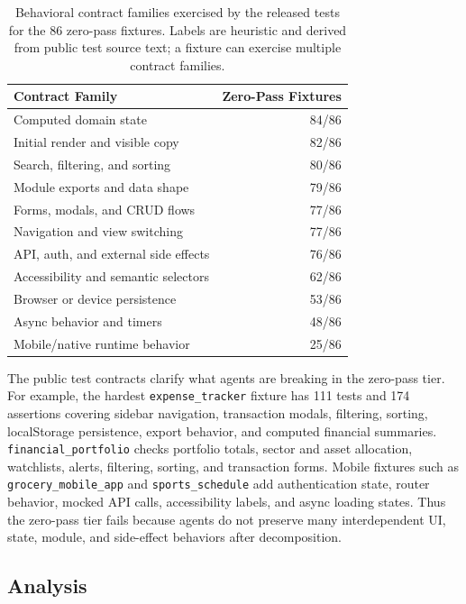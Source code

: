\documentclass[11pt,letterpaper]{article}
\begin{document}
\begin{table}[ht]
\centering
\caption{Behavioral contract families exercised by the released tests for the 86 zero-pass fixtures. Labels are heuristic and derived from public test source text; a fixture can exercise multiple contract families.}
\label{tab:zero-pass-contracts}
\small
\begin{tabular}{lr}
\toprule
\textbf{Contract Family} & \textbf{Zero-Pass Fixtures} \\
\midrule
Computed domain state & 84/86 \\
Initial render and visible copy & 82/86 \\
Search, filtering, and sorting & 80/86 \\
Module exports and data shape & 79/86 \\
Forms, modals, and CRUD flows & 77/86 \\
Navigation and view switching & 77/86 \\
API, auth, and external side effects & 76/86 \\
Accessibility and semantic selectors & 62/86 \\
Browser or device persistence & 53/86 \\
Async behavior and timers & 48/86 \\
Mobile/native runtime behavior & 25/86 \\
\bottomrule
\end{tabular}
\end{table}

\noindent The public test contracts clarify what agents are breaking in the zero-pass tier. For example, the hardest \texttt{expense\_tracker} fixture has 111 tests and 174 assertions covering sidebar navigation, transaction modals, filtering, sorting, localStorage persistence, export behavior, and computed financial summaries. \texttt{financial\_portfolio} checks portfolio totals, sector and asset allocation, watchlists, alerts, filtering, sorting, and transaction forms. Mobile fixtures such as \texttt{grocery\_mobile\_app} and \texttt{sports\_schedule} add authentication state, router behavior, mocked API calls, accessibility labels, and async loading states. Thus the zero-pass tier fails because agents do not preserve many interdependent UI, state, module, and side-effect behaviors after decomposition.

\subsection{Analysis}
\end{document}
